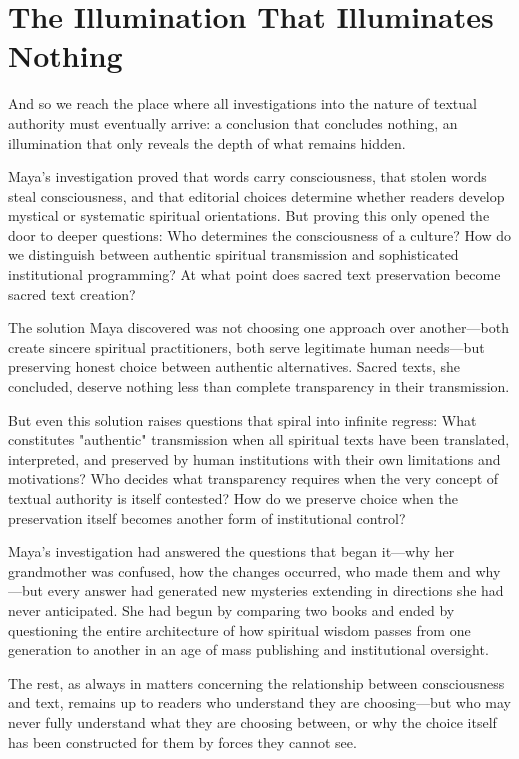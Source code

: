 \documentclass[11pt,twoside]{book}
\begin{document}
\section*{The Illumination That Illuminates Nothing}
\label{sec:orga478685}

And so we reach the place where all investigations into the nature of textual authority must eventually arrive: a conclusion that concludes nothing, an illumination that only reveals the depth of what remains hidden.

Maya's investigation proved that words carry consciousness, that stolen words steal consciousness, and that editorial choices determine whether readers develop mystical or systematic spiritual orientations. But proving this only opened the door to deeper questions: Who determines the consciousness of a culture? How do we distinguish between authentic spiritual transmission and sophisticated institutional programming? At what point does sacred text preservation become sacred text creation?

The solution Maya discovered was not choosing one approach over another—both create sincere spiritual practitioners, both serve legitimate human needs—but preserving honest choice between authentic alternatives. Sacred texts, she concluded, deserve nothing less than complete transparency in their transmission.

But even this solution raises questions that spiral into infinite regress: What constitutes "authentic" transmission when all spiritual texts have been translated, interpreted, and preserved by human institutions with their own limitations and motivations? Who decides what transparency requires when the very concept of textual authority is itself contested? How do we preserve choice when the preservation itself becomes another form of institutional control?

Maya's investigation had answered the questions that began it—why her grandmother was confused, how the changes occurred, who made them and why—but every answer had generated new mysteries extending in directions she had never anticipated. She had begun by comparing two books and ended by questioning the entire architecture of how spiritual wisdom passes from one generation to another in an age of mass publishing and institutional oversight.

The rest, as always in matters concerning the relationship between consciousness and text, remains up to readers who understand they are choosing—but who may never fully understand what they are choosing between, or why the choice itself has been constructed for them by forces they cannot see.
\end{document}
